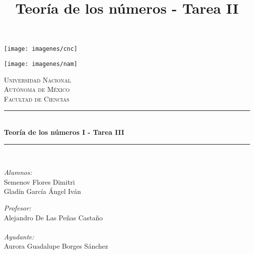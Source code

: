 \documentclass[12pt]{article}
\title{Teoría de los números - Tarea II}
\newcommand{\HRule}{\rule{\linewidth}{0.5mm}}
\begin{document}

    \begin{center}
        \begin{minipage}{0.48\textwidth} \begin{flushleft}
        \texttt{[image: imagenes/cnc]}
        \end{flushleft}\end{minipage}
        \begin{minipage}{0.48\textwidth} \begin{flushright}
        \texttt{[image: imagenes/nam]}
        \end{flushright}\end{minipage}

        \vspace*{-1.5cm}

        \textsc{\Large Universidad Nacional \\Autónoma de México}\\[1.5cm]

        \textsc{\LARGE Facultad de Ciencias}\\[3cm]

        \vspace*{1.5cm}

        \HRule \\[0.7cm]
        {\Large \bfseries Teoría de los números I - Tarea III}\\[0.4cm]
        \HRule \\[1.5cm]

        \vfill

        \begin{minipage}{0.50\textwidth}
            \begin{center} \large
                \emph{Alumnos:}\\
                Semenov Flores Dimitri\\
                Gladín García Ángel Iván
            \end{center}
        \end{minipage}
        \begin{minipage}{0.42\textwidth}
            \begin{center} \large
                \emph{Profesor:} \\
                Alejandro De Las Peñas Castaño\\
                \emph{\\Ayudante:}\\ 
               Aurora Guadalupe Borges Sánchez \\
            \end{center}
        \end{minipage}
        \vspace*{1cm}


\end{center}
\end{document}
